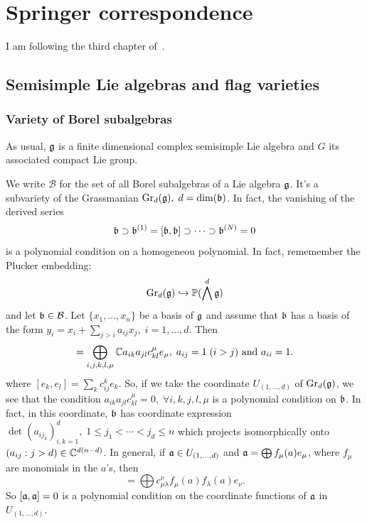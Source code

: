 \chapter{Springer correspondence}
I am following the third chapter of~\cite{chriss1997representation}. 
\section{Semisimple Lie algebras and flag varieties}
\subsection{Variety of Borel subalgebras}
As usual, $\mathfrak{g}$ is a finite dimensional complex semisimple Lie algebra and $G$ its associated compact 
Lie group.\par
    
We write $\mathcal{B}$ for the set of all Borel subalgebras of a Lie algebra $\mathfrak{g}$. It's a subvariety of 
the Grassmanian $\text{Gr}_{d}(\mathfrak{g}),\;d=\dim(\mathfrak{b})$. In fact, the vanishing of the derived series
    \begin{equation}
        \mathfrak{b} \supset \mathfrak{b}^{(1)}=[\mathfrak{b},\mathfrak{b}]\supset\cdots\supset \mathfrak{b}^{(N)}=0
    \end{equation}
is a polynomial condition on a homogeneou polynomial. In fact, rememember the Plucker embedding:
    \begin{equation}
        \text{Gr}_{d}(\mathfrak{g})\hookrightarrow \mathbb{P}(\bigwedge^{d}\mathfrak{g}) 
    \end{equation}
and let $\mathfrak{b}\in \mathcal{B}$. Let $\{x_1,\dots,x_n\}$ be a basis of $\mathfrak{g}$ and
assume that $\mathfrak{b}$ has a basis of the form $y_i = x_i+\sum_{j>i}a_{ij}x_j,\;i=1,\dots,d$. Then 
\begin{equation}
    [\fr{b},\fr{b}] = \bigoplus_{i,j,k,l,\mu}\bbC a_{ik}a_{jl}c_{kl}^\mu e_\mu, \; a_{ij}=1\;(i>j)\text{ and } a_{ii}=1.
\end{equation}
where $[e_k,e_l]=\sum_k c_{ij}^ke_k$. So, if we take the coordinate $U_{(1,\dots,d)}$ of $\text{Gr}_{d}(\mathfrak{g})$, we see that 
the condition $a_{ik}a_{jl}c_{kl}^\mu=0,\;\forall i,k,j,l,\mu$ is a polynomial condition on 
$\mathfrak{b}$. In fact, in this coordinate, $\mathfrak{b}$ has coordinate expression 
$\det(a_{ij_k})_{i,k=1}^{d},\;1\leq j_1<\cdots<j_{d}\leq n$ which projects isomorphically onto 
$(a_{ij}:j>d)\in\mathbb{C}^{d(n-d)}$. In general, if 
$\mathfrak{a}\in U_{(1,\dots,d)}$ and $\mathfrak{a}=\bigoplus f_\mu(a)e_\mu$, where $f_\mu$ are monomials in the $a$'s, then 
\begin{equation}
    [\fr{a},\fr{a}]=\bigoplus c_{\mu\lambda}^\nu f_\mu(a)f_\lambda(a)e_\nu.
\end{equation}
So $[\mathfrak{a},\mathfrak{a}]=0$ is a polynomial condition on the coordinate functions of $\mathfrak{a}$ in $U_{(1,\dots,d)}$. 

